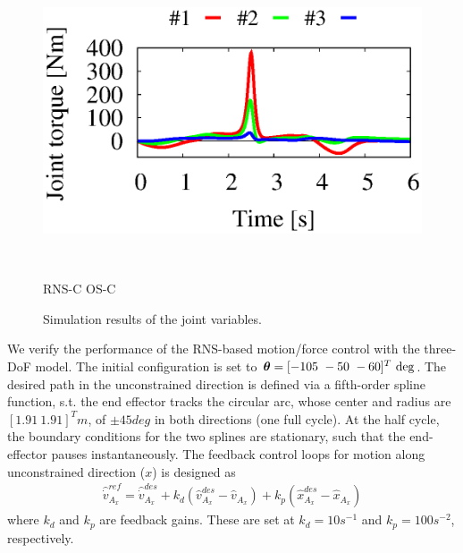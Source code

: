 \begin{figure}[t]
\begin{minipage}[h]{0.40\linewidth}
  \end{minipage}
  \begin{minipage}[h]{0.40\linewidth}
    \centering
    \includegraphics[width=1.0\linewidth]{fig/chapter6/results/planar/OSF/3RFIX_OSF_U01_torque.eps}
  \end{minipage}\\
  \footnotesize\par{RNS-C \hspace{13em} OS-C}
  \vspace{1em}
  \caption{Simulation results of the joint variables.}
  \label{fig:RES_MF_3R_JOINT}
\end{figure}
%

We verify the performance of the RNS-based motion/force control with the three-DoF model.
The initial configuration is set to ${\bm{\theta}} = [-105~-50~-60]^{T}{~\mathrm{deg}}$.
The desired path in the unconstrained direction is defined via a fifth-order spline function,
s.t. the end effector tracks the circular arc,
whose center and radius are $[1.91~1.91]^{T}\unit{m}$,
of $\pm 45\unit{deg}$ in both directions (one full cycle).
At the half cycle, the boundary conditions for the two splines are stationary, such that the end-effector pauses
instantaneously.
The feedback control loops for motion along unconstrained direction ($x$) is designed as
%
\begin{align}
  \hat{\dot{v}}_{A_{x}}^{ref} = \hat{\dot{v}}_{A_{x}}^{des} + k_{d}(\hat{v}_{A_{x}}^{des} - \hat{v}_{A_{x}}) +
  k_{p}(\hat{x}_{A_{x}}^{des} - \hat{x}_{A_{x}})
\end{align}
%
where $k_{d}$ and $k_{p}$ are feedback gains.
These are set at $k_{d} = 10\unit{s^{-1}}$ and $k_{p} = 100\unit{s^{-2}}$, respectively.

